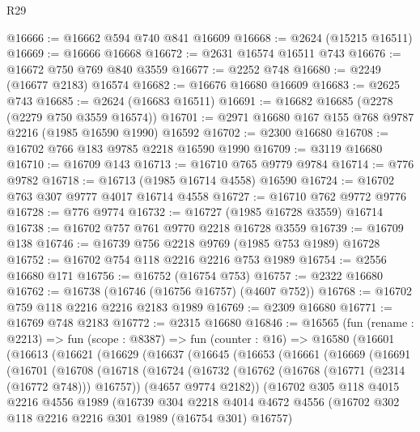 \begin{lexlean}{R29}
\begin{coremodule}
@16666 := @16662 @594 @740 @841 @16609
@16668 := @2624 (@15215 @16511)
@16669 := @16666 @16668
@16672 := @2631 @16574 @16511 @743
@16676 := @16672 @750 @769 @840 @3559
@16677 := @2252 @748
@16680 := @2249 (@16677 @2183) @16574
@16682 := @16676 @16680 @16609
@16683 := @2625 @743
@16685 := @2624 (@16683 @16511)
@16691 := @16682 @16685 (@2278 (@2279 @750 @3559 @16574))
@16701 := @2971 @16680 @167 @155 @768 @9787 @2216 (@1985 @16590 @1990) @16592
@16702 := @2300 @16680
@16708 := @16702 @766 @183 @9785 @2218 @16590 @1990
@16709 := @3119 @16680
@16710 := @16709 @143
@16713 := @16710 @765 @9779 @9784
@16714 := @776 @9782
@16718 := @16713 (@1985 @16714 @4558) @16590
@16724 := @16702 @763 @307 @9777 @4017 @16714 @4558
@16727 := @16710 @762 @9772 @9776
@16728 := @776 @9774
@16732 := @16727 (@1985 @16728 @3559) @16714
@16738 := @16702 @757 @761 @9770 @2218 @16728 @3559
@16739 := @16709 @138
@16746 := @16739 @756 @2218 @9769 (@1985 @753 @1989) @16728
@16752 := @16702 @754 @118 @2216 @2216 @753 @1989
@16754 := @2556 @16680 @171
@16756 := @16752 (@16754 @753)
@16757 := @2322 @16680
@16762 := @16738 (@16746 (@16756 @16757) (@4607 @752))
@16768 := @16702 @759 @118 @2216 @2216 @2183 @1989
@16769 := @2309 @16680
@16771 := @16769 @748 @2183
@16772 := @2315 @16680
@16846 := @16565
    (fun (rename : @2213) =>
    fun (scope : @8387) =>
    fun (counter : @16) =>
    @16580
      (@16601
        (@16613
          (@16621
            (@16629
              (@16637
                (@16645
                  (@16653
                    (@16661
                      (@16669
                        (@16691
                          (@16701
                            (@16708
                              (@16718
                                (@16724
                                  (@16732
                                    (@16762 (@16768 (@16771 (@2314 (@16772 @748))) @16757))
                                    (@4657 @9774 @2182))
                                  (@16702
                                    @305
                                    @118
                                    @4015
                                    @2216
                                    @4556
                                    @1989
                                    (@16739
                                      @304
                                      @2218
                                      @4014
                                      @4672
                                      @4556
                                      (@16702 @302 @118 @2216 @2216 @301 @1989 (@16754 @301) @16757)

\end{coremodule}
\end{lexlean}
